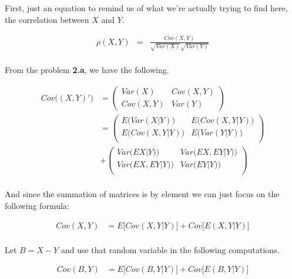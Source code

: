 \documentclass[letter]{article}
\begin{document}
First, just an equation to remind us of what we're actually trying to find here, the correlation between $X$ and $Y$.

\begin{equation*}
	\begin{aligned}
	\rho(X,Y) &=& \frac{Cov(X, Y)}{\sqrt{Var(X)}\sqrt{Var(Y)}} \\
	\end{aligned}
\end{equation*}

From the problem \textbf{2.a}, we have the following.

\begin{equation*}
	\begin{aligned}
		Cov\big((X,Y)'\big) &=
		 \left(
		\begin{array}{cc}
			Var(X) & Cov(X,Y)\\
			Cov(X,Y) & Var(Y)
		\end{array}
		\right) \\
		&= \left(
		\begin{array}{cc}
			E\big(Var(X|Y)\big) & E\big(Cov(X,Y|Y)\big) \\
			E\big(Cov(X,Y|Y)\big) & E\big(Var(Y|Y)\big) \\
		\end{array}
		\right) \\
		&+ \left(
		\begin{array}{cc}
			Var\big(EX|Y)\big) & Var\big(EX,EY|Y)\big) \\
			Var\big(EX,EY|Y)\big) & Var\big(EY|Y)\big) \\
		\end{array}
		\right) \\
	\end{aligned}
\end{equation*}

And since the summation of matrices is by element we can just focus on the following formula:

\begin{equation*}
	\begin{aligned}
	Cov(X,Y) &= E\big[Cov(X,Y|Y)\big] + Cov\big[E(X,Y|Y)\big]\\
	\end{aligned}
\end{equation*}

Let $B=X-Y$ and use that random variable in the following computations.

\begin{equation*}
	\begin{aligned}
	Cov(B,Y) &= E\big[Cov(B,Y|Y)\big] + Cov\big[E(B,Y|Y)\big]\\
	\end{aligned}
\end{equation*}
\end{document}
